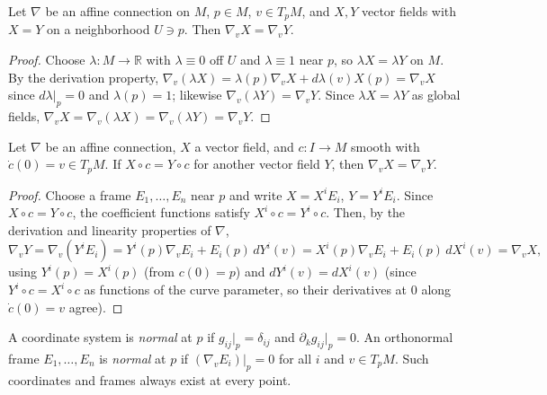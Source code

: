 \begin{lemma}
  \label{lem:pet-ch2-locality-open-set}
  \leanok
  Let $\nabla$ be an affine connection on $M$, $p\in M$, $v\in T_pM$, and
  $X,Y$ vector fields with $X=Y$ on a neighborhood $U\ni p$. Then
  $\nabla_vX=\nabla_vY$.
\end{lemma}
\begin{proof}
  \leanok
  Choose $\lambda:M\to\mathbb{R}$ with $\lambda\equiv0$ off $U$ and $\lambda\equiv1$
  near $p$, so $\lambda X=\lambda Y$ on $M$. By the derivation property,
  $\nabla_v(\lambda X)=\lambda(p)\nabla_vX+d\lambda(v)X(p)=\nabla_vX$ since
  $d\lambda|_p=0$ and $\lambda(p)=1$; likewise $\nabla_v(\lambda Y)=\nabla_vY$.
  Since $\lambda X=\lambda Y$ as global fields,
  $\nabla_vX=\nabla_v(\lambda X)=\nabla_v(\lambda Y)=\nabla_vY$.
\end{proof}

\begin{lemma}
  \label{lem:pet-ch2-locality-along-curve}
  \leanok
  Let $\nabla$ be an affine connection, $X$ a vector field, and $c:I\to M$
  smooth with $\dot c(0)=v\in T_pM$. If $X\circ c=Y\circ c$ for another vector
  field $Y$, then $\nabla_vX=\nabla_vY$.
\end{lemma}
\begin{proof}
  \leanok
  Choose a frame $E_1,\dots,E_n$ near $p$ and write $X=X^iE_i$, $Y=Y^iE_i$.
  Since $X\circ c=Y\circ c$, the coefficient functions satisfy
  $X^i\circ c=Y^i\circ c$. Then, by the derivation and linearity properties
  of $\nabla$,
  \[
    \nabla_vY = \nabla_v(Y^iE_i) = Y^i(p)\nabla_vE_i+E_i(p)\,dY^i(v)
    = X^i(p)\nabla_vE_i+E_i(p)\,dX^i(v) = \nabla_vX,
  \]
  using $Y^i(p)=X^i(p)$ (from $c(0)=p$) and $dY^i(v)=dX^i(v)$ (since
  $Y^i\circ c=X^i\circ c$ as functions of the curve parameter, so their
  derivatives at $0$ along $\dot c(0)=v$ agree).
\end{proof}

\begin{definition}
  \label{def:pet-ch2-normal-coordinates-frame}
  \leanok
  A coordinate system is \emph{normal} at $p$ if $g_{ij}|_p=\delta_{ij}$ and
  $\partial_kg_{ij}|_p=0$. An orthonormal frame $E_1,\dots,E_n$ is \emph{normal}
  at $p$ if $(\nabla_vE_i)|_p=0$ for all $i$ and $v\in T_pM$. Such coordinates
  and frames always exist at every point.
\end{definition}

